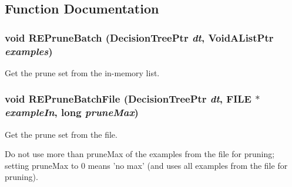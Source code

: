 \subsection{Function Documentation}
\subsubsection{\setlength{\rightskip}{0pt plus 5cm}void REPrune\-Batch ({\bf Decision\-Tree\-Ptr} {\em dt}, Void\-AList\-Ptr {\em examples})}\label{REPrune_8h_a0}


Get the prune set from the in-memory list. 

\subsubsection{\setlength{\rightskip}{0pt plus 5cm}void REPrune\-Batch\-File ({\bf Decision\-Tree\-Ptr} {\em dt}, FILE $\ast$ {\em example\-In}, long {\em prune\-Max})}\label{REPrune_8h_a1}


Get the prune set from the file. 

Do not use more than prune\-Max of the examples from the file for pruning; setting prune\-Max to 0 means 'no max' (and uses all examples from the file for pruning). 